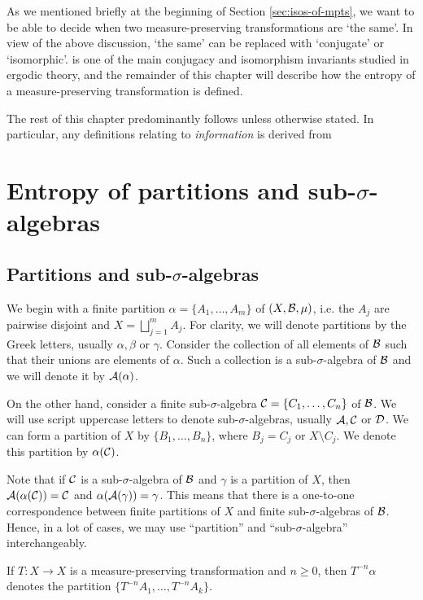 As we mentioned briefly at the beginning of Section \ref{sec:isos-of-mpts}, we want to be able to decide when two measure-preserving transformations are `the same'. In view of the above discussion, `the same' can be replaced with `conjugate' or `isomorphic'.  is one of the main conjugacy and isomorphism invariants studied in ergodic theory, and the remainder of this chapter will describe how the entropy of a measure-preserving transformation is defined.

The rest of this chapter predominantly follows \cite[Chapter 4]{walters:intro-to-ergodic-theory} unless otherwise stated. In particular, any definitions relating to \emph{information} is derived from \cite[p33-34]{parry-pollicott:zeta-fns-periodic-orbits}

\section{Entropy of partitions and sub-\texorpdfstring{$\sigma$}{sigma}-algebras}
\subsection{Partitions and sub-\texorpdfstring{$\sigma$}{sigma}-algebras}

We begin with a finite partition $\alpha = \{A_1, \dots, A_m\}$ of $(X, \mathcal{B}, \mu)$, i.e. the $A_j$ are pairwise disjoint and $X = \bigsqcup_{j = 1}^m{A_j}$. For clarity, we will denote partitions by the Greek letters, usually $\alpha, \beta$ or $\gamma$. Consider the collection of all elements of $\mathcal{B}$ such that their unions are elements of $\alpha$. Such a collection is a sub-$\sigma$-algebra of $\mathcal{B}$ and we will denote it by $\mathcal{A}(\alpha)$.

On the other hand, consider a finite sub-$\sigma$-algebra $\mathcal{C} = \{C_1, \dots, C_n\}$ of $\mathcal{B}$. We will use script uppercase letters to denote sub-$\sigma$-algebras, usually $\mathcal{A}, \mathcal{C}$ or $\mathcal{D}$. We can form a partition of $X$ by $\{B_1, \dots, B_n\}$, where $B_j = C_j$ or $X \setminus C_j$. We denote this partition by $\alpha(\mathcal{C})$.

Note that if $\mathcal{C}$ is a sub-$\sigma$-algebra of $\mathcal{B}$ and $\gamma$ is a partition of $X$, then $\mathcal{A}(\alpha(\mathcal{C})) = \mathcal{C}$ and $\alpha(\mathcal{A}(\gamma)) = \gamma$. This means that there is a one-to-one correspondence between finite partitions of $X$ and finite sub-$\sigma$-algebras of $\mathcal{B}$. Hence, in a lot of cases, we may use ``partition'' and ``sub-$\sigma$-algebra'' interchangeably.

If $T: X \to X$ is a measure-preserving transformation and $n \geq 0$, then $T^{-n}{\alpha}$ denotes the partition $\{T^{-n}{A_1}, \dots, T^{-n}{A_k}\}$.

